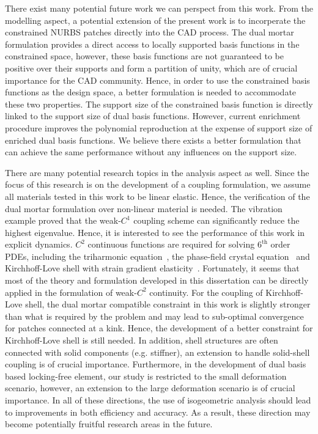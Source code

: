There exist many potential future work we can perspect from this work. From the modelling aspect, a potential extension of the present work is to incorperate the constrained NURBS patches directly into the CAD process. The dual mortar formulation provides a direct access to locally supported basis functions in the constrained space, however, these basis functions are not guaranteed to be positive over their supports and form a partition of unity, which are of crucial importance for the CAD community. Hence, in order to use the constrained basis functions as the design space, a better formulation is needed to accommodate these two properties. The support size of the constrained basis function is directly linked to the support size of dual basis functions. However, current enrichment procedure improves the polynomial reproduction at the expense of support size of enriched \Bezier dual basis functions. We believe there exists a better formulation that can achieve the same performance without any influences on the support size.\par

There are many potential research topics in the analysis aspect as well. Since the focus of this research is on the development of a coupling formulation, we assume all materials tested in this work to be linear elastic. Hence, the verification of the dual mortar formulation over non-linear material is needed. The vibration example proved that the weak-$C^1$ coupling scheme can significantly reduce the highest eigenvalue. Hence, it is interested to see the performance of this work in explicit dynamics. $C^2$ continuous functions are required for solving $6^\text{th}$ order PDEs, including the triharmonic equation~\cite{tagliabue2014isogeometric, bartezzaghi2015isogeometric}, the phase-field crystal equation~\cite{gomez2012unconditionally} and Kirchhoff-Love shell with strain gradient elasticity~\cite{balobanov2019kirchhoff}. Fortunately, it seems that most of the theory and formulation developed in this dissertation can be directly applied in the formulation of weak-$C^2$ continuity. For the coupling of Kirchhoff-Love shell, the dual mortar compatible constraint in this work is slightly stronger than what is required by the problem and may lead to sub-optimal convergence for patches connected at a kink. Hence, the development of a better constraint for Kirchhoff-Love shell is still needed. In addition, shell structures are often connected with solid components (e.g. stiffner), an extension to handle solid-shell coupling is of crucial importance. Furthermore, in the development of dual basis based locking-free element, our study is restricted to the small deformation scenario, however, an extension to the large deformation scenario is of crucial importance. In all of these directions, the use of isogeometric analysis should lead to improvements in both efficiency and accuracy. As a result, these direction may become potentially fruitful research areas in the future.